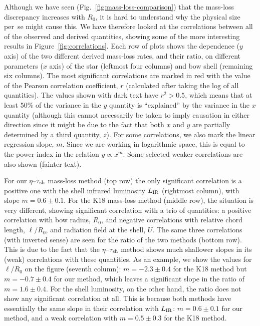 Although we have seen (Fig.~\ref{fig:mass-loss-comparison}) that the
mass-loss discrepancy increases with \(R_0\), it is hard to understand
why the physical size per~se might cause this.  We have therefore
looked at the correlations between all of the observed and derived
quantities, showing some of the more interesting results in
Figure~\ref{fig:correlations}.  Each row of plots shows the dependence
(\(y\) axis) of the two different derived mass-loss rates, and their
ratio, on different parameters (\(x\) axis) of the star (leftmost four
columns) and bow shell (remaining six columns).  The most significant
correlations are marked in red with the value of the Pearson
correlation coefficient, \(r\) (calculated after taking the log of all
quantities).  The values shown with dark text have \(r^2 > 0.5\),
which means that at least 50\% of the variance in the \(y\) quantity
is ``explained'' by the variance in the \(x\) quantity (although this
cannot necessarily be taken to imply causation in either direction
since it might be due to the fact that both \(x\) and \(y\) are
partially determined by a third quantity, \(z\)). For some
correlations, we also mark the linear regression slope, \(m\).  Since
we are working in logarithmic space, this is equal to the power index
in the relation \(y \propto x^m\).  Some selected weaker correlations
are also shown (fainter text).

For our \(\eta\)--\(\tau_{\text{sh}}\) mass-loss method (top row) the only
significant correlation is a positive one with the shell infrared
luminosity \(L_{\text{IR}}\) (rightmost column), with slope
\(m = 0.6 \pm 0.1\).  For the K18 mass-loss method (middle row), the
situation is very different, showing significant correlation with a
trio of quantities: a positive correlation with bow radius, \(R_0\),
and negative correlations with relative chord length, \(\ell/R_0\),
and radiation field at the shell, \(U\).  The same three correlations
(with inverted sense) are seen for the ratio of the two methods
(bottom row).  This is due to the fact that the
\(\eta\)--\(\tau_{\text{sh}}\) method shows much shallower slopes in its
(weak) correlations with these quantities.  As an example, we show the
values for \(\ell/R_0\) on the figure (seventh column):
\(m = -2.3 \pm 0.4\) for the K18 method but \(m = -0.7 \pm 0.4\) for
our method, which leaves a significant slope in the ratio of
\(m = 1.6 \pm 0.4\).  For the shell luminosity, on the other hand, the
ratio does not show any significant correlation at all.  This is
because both methods have essentially the same slope in their
correlation with \(L_{\text{IR}}\): \(m = 0.6 \pm 0.1\) for our method, and a
weak correlation with \(m = 0.5 \pm 0.3\) for the K18 method.

